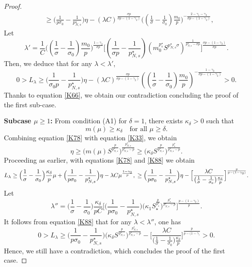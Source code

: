 \documentclass[reqno]{amsart}
\begin{document}
\begin{proof}
\begin{align*}
&\geq\Big(\frac{1}{p\sigma_0}-\frac{1}{p^\star_{N,s}}\Big)\eta
 -( \lambda C)^\frac{\sigma p}{\sigma p-(1-\gamma_2)}
 \Big((\frac{1}{\sigma}-\frac{1}{\sigma_0})
 \frac{m_0}{p}\Big)^{-\frac{2-\gamma_1-\gamma_2}{\sigma p-(1-\gamma_2)}} ,
\end{align*}
Let
\begin{equation}\label{lambda1}
\lambda'=\frac{1}{C}\Big((\frac{1}{\sigma}
 -\frac{1}{\sigma_0})\frac{m_0}{p}\Big)^{\frac{1-\gamma_2}{\sigma p}}
 \Big[(\frac{1}{\sigma p}-\frac{1}{p^\star_{N,s}})(m_0^{p^\star_s}
 S^{p^\star_{N,s}\sigma})^\frac{1}{p^\star_{N,s}
 -\sigma p}\Big]^\frac{\sigma p-(1-\gamma_2)}{\sigma p}.
\end{equation}
Then, we deduce  that for any $\lambda<\lambda'$,
\begin{equation*}
0>L_\lambda\geq\Big(\frac{1}{\sigma_0p}
-\frac{1}{p^\star_{N,s}}\Big)\eta-(\lambda C)^\frac{\sigma p}{\sigma p-(1-\gamma_2)}
((\frac{1}{\sigma}-\frac{1}{\sigma_0})\frac{m_0}{p})^{-\frac{1-\gamma_2}
{\sigma p-(1-\gamma_2)}} >0.
\end{equation*}
Thanks to equation \eqref{K66}, we obtain our contradiction concluding the proof
of the first sub-case.
\smallskip

\noindent\textbf{Subcase $\mu\geq 1$:} 
From condition (A1) for $\delta=1$, there exists $\kappa_\delta>0$ such that
\begin{equation}\label{K78}
m(\mu)\geq \kappa_\delta \quad \text{for all } \mu\geq \delta.
\end{equation}
Combining equation \eqref{K78} with equation \eqref{K33}, we obtain
\begin{equation}\label{K88}
\eta\geq \Big(m(\mu)S^\frac{p}{p^\star_{N,s}}\Big)^\frac{p^\star_{N,s}}{p^\star_{N,s}-p}
 \geq \Big(\kappa_\delta S^\frac{p}{p^\star_{N,s}}\Big)^\frac{p^\star_s}
 {p^\star_{N,s}-p}.
\end{equation}
Proceeding as earlier, with equations \eqref{K78} and \eqref{K88} we obtain
\[
L_\lambda \geq \Big(\frac{1}{\sigma}-\frac{1}{\sigma_0}\Big)\frac{\kappa_\delta}{p}\mu
 +\Big(\frac{1}{p\sigma_0}-\frac{1}{p^\star_{N,s}}\Big)\eta
  -\lambda C \mu^\frac{1-\gamma_2}{p},\\
\geq \Big(\frac{1}{p\sigma_0}-\frac{1}{p^\star_{N,s}}\Big)\eta
 -\Big[\frac{\lambda C}{\big(\frac{1}{\sigma}-\frac{1}{\sigma_0}\big)
 \frac{\kappa_\delta}{p}}\Big]^\frac{p}{p-(1-\gamma_2)}.
\]
Let
\begin{equation}\label{lambda2}
\lambda''=\Big(\frac{1}{\sigma}-\frac{1}{\sigma_0}\Big)
\frac{\kappa_\delta}{pC }\Big[\Big(\frac{1}{p\sigma_0}
-\frac{1}{p^\star_{N,s}}\Big)\Big(\kappa_1S_\star^\frac{p}{p^\star_s}
 \Big)^\frac{p^\star_s}{p^\star_{N,s}-p}\Big]^\frac{p-(1-\gamma_2)}{p}.
\end{equation}
It follows from equation \eqref{K88} that for any $\lambda<\lambda''$, one has
\[
0>L_\lambda\geq\Big(\frac{1}{p\sigma_0}-\frac{1}{p^\star_{N,s}}\Big)
\Big(\kappa_\delta S^\frac{p}{p^\star_{N,s}}\Big)^\frac{p^\star_{N,s}}{p^\star_{N,s}-p}
-\Big[\frac{\lambda C}{\big(\frac{1}{\sigma}-\frac{1}{\sigma_0}\big)
\frac{\kappa_\delta}{p}}\Big]^\frac{p}{p-(1-\gamma_)}>0.
\]
Hence, we still have a contradiction, which concludes the proof of the first case.
\smallskip


\end{proof}
\end{document}
